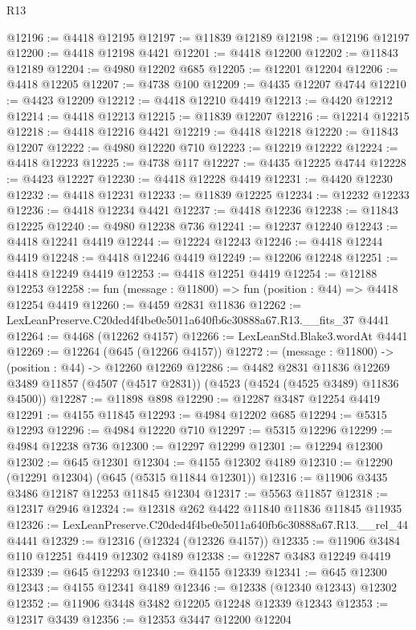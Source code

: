 \begin{lexlean}{R13}
\begin{coremodule}
@12196 := @4418 @12195
@12197 := @11839 @12189
@12198 := @12196 @12197
@12200 := @4418 @12198 @4421
@12201 := @4418 @12200
@12202 := @11843 @12189
@12204 := @4980 @12202 @685
@12205 := @12201 @12204
@12206 := @4418 @12205
@12207 := @4738 @100
@12209 := @4435 @12207 @4744
@12210 := @4423 @12209
@12212 := @4418 @12210 @4419
@12213 := @4420 @12212
@12214 := @4418 @12213
@12215 := @11839 @12207
@12216 := @12214 @12215
@12218 := @4418 @12216 @4421
@12219 := @4418 @12218
@12220 := @11843 @12207
@12222 := @4980 @12220 @710
@12223 := @12219 @12222
@12224 := @4418 @12223
@12225 := @4738 @117
@12227 := @4435 @12225 @4744
@12228 := @4423 @12227
@12230 := @4418 @12228 @4419
@12231 := @4420 @12230
@12232 := @4418 @12231
@12233 := @11839 @12225
@12234 := @12232 @12233
@12236 := @4418 @12234 @4421
@12237 := @4418 @12236
@12238 := @11843 @12225
@12240 := @4980 @12238 @736
@12241 := @12237 @12240
@12243 := @4418 @12241 @4419
@12244 := @12224 @12243
@12246 := @4418 @12244 @4419
@12248 := @4418 @12246 @4419
@12249 := @12206 @12248
@12251 := @4418 @12249 @4419
@12253 := @4418 @12251 @4419
@12254 := @12188 @12253
@12258 := fun (message : @11800) => fun (position : @44) => @4418 @12254 @4419
@12260 := @4459 @2831 @11836
@12262 := LexLeanPreserve.C20ded4f4be0e5011a640fb6c30888a67.R13.__fits_37 @4441
@12264 := @4468 (@12262 @4157)
@12266 := LexLeanStd.Blake3.wordAt @4441
@12269 := @12264 (@645 (@12266 @4157))
@12272 := (message : @11800) -> (position : @44) -> @12260 @12269
@12286 := @4482
    @2831
    @11836
    @12269
    @3489
    @11857
    (@4507 (@4517 @2831))
    (@4523 (@4524 (@4525 @3489) @11836 @4500))
@12287 := @11898 @898
@12290 := @12287 @3487 @12254 @4419
@12291 := @4155 @11845
@12293 := @4984 @12202 @685
@12294 := @5315 @12293
@12296 := @4984 @12220 @710
@12297 := @5315 @12296
@12299 := @4984 @12238 @736
@12300 := @12297 @12299
@12301 := @12294 @12300
@12302 := @645 @12301
@12304 := @4155 @12302 @4189
@12310 := @12290 (@12291 @12304) (@645 (@5315 @11844 @12301))
@12316 := @11906 @3435 @3486 @12187 @12253 @11845 @12304
@12317 := @5563 @11857
@12318 := @12317 @2946
@12324 := @12318 @262 @4422 @11840 @11836 @11845 @11935
@12326 := LexLeanPreserve.C20ded4f4be0e5011a640fb6c30888a67.R13.__rel_44 @4441
@12329 := @12316 (@12324 (@12326 @4157))
@12335 := @11906 @3484 @110 @12251 @4419 @12302 @4189
@12338 := @12287 @3483 @12249 @4419
@12339 := @645 @12293
@12340 := @4155 @12339
@12341 := @645 @12300
@12343 := @4155 @12341 @4189
@12346 := @12338 (@12340 @12343) @12302
@12352 := @11906 @3448 @3482 @12205 @12248 @12339 @12343
@12353 := @12317 @3439
@12356 := @12353 @3447 @12200 @12204

\end{coremodule}
\end{lexlean}
